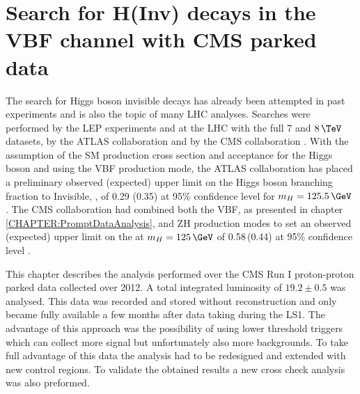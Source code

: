 \chapter{Search for H(Inv) decays in the VBF channel with CMS parked data}
\label{CHAPTER:ParkedDataAnalysis}

\glsresetall %



The search for Higgs boson invisible decays has already been attempted in past experiments and is also the topic of many \gls{LHC} analyses. Searches were performed by the \gls{LEP} experiments \cite{ARTICLE:LEPSearchesForInvisibleHiggsBosons,ARTICLE:LEPDELPHISearchesForInvisibleDecayingHiggsBosons,ARTICLE:LEPOPALSearchForInvisiblyDecayingHiggsBosons} and at the \gls{LHC} with the full 7 and $8\,\TeV$ datasets, by the \gls{ATLAS} collaboration \cite{ARTICLE:ATLASSearchForInvisibleDecaysHiggsBosonAssociatedZ,ARTICLE:ATLASSearchForDarkMatterWithHadronicallyWorZ,ARTICLE:ATLASMonoJetPlusMET,ARTICLE:ATLASVBFHiggsInvConfNote} and by the \gls{CMS} collaboration \cite{ARTICLE:CMSVBFHiggsToInvAndZHCombination}. With the assumption of the \gls{SM} production cross section and acceptance for the Higgs boson and using the \gls{VBF} production mode, the \gls{ATLAS} collaboration has placed a preliminary observed (expected) upper limit on the Higgs boson branching fraction to Invisible, \BRinv, of 0.29 (0.35) at 95\% confidence level for $m_H=125.5\,\GeV$ \cite{ARTICLE:ATLASVBFHiggsInvConfNote}. The \gls{CMS} collaboration had combined both the \gls{VBF}, as presented in chapter \ref{CHAPTER:PromptDataAnalysis}, and ZH production modes to set an observed (expected) upper limit on the \BRinv at  $m_H=125\,\GeV$ of 0.58\,(0.44) at 95\% confidence level \cite{ARTICLE:CMSVBFHiggsToInvAndZHCombination}.

This chapter describes the analysis performed over the \gls{CMS} Run I proton-proton parked data collected over 2012. A total integrated luminosity of $19.2 \pm 0.5$ was analysed. This data was recorded and stored without reconstruction and only became fully available a few months after data taking during the \gls{LS1}. The advantage of this approach was the possibility of using lower threshold triggers which can collect more signal but unfortunately also more backgrounds. To take full advantage of this data the analysis had to be redesigned and extended with new control regions. To validate the obtained results a new cross check analysis was also preformed.

